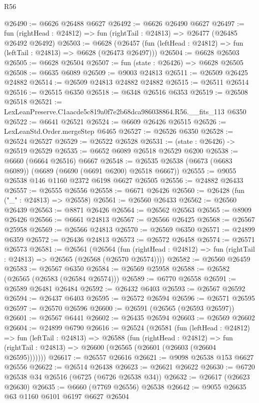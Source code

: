 \begin{lexlean}{R56}
\begin{coremodule}
@26490 := @6626 @26488 @6627
@26492 := @6626 @26490 @6627
@26497 := fun (rightHead : @24812) => fun (rightTail : @24813) => @26477 (@26485 @26492 @26492)
@26503 := @6628
    (@26457 (fun (leftHead : @24812) => fun (leftTail : @24813) => @6628 (@26473 @26497)))
@26504 := @6628 @26503
@26505 := @6628 @26504
@26507 := fun (state : @26426) => @6628 @26505
@26508 := @6635 @6089
@26509 := @9003 @24813
@26511 := @26509 @26425 @24882
@26514 := @26509 @24813 @24882 @24882
@26515 := @26511 @26514
@26516 := @26515 @6350
@26518 := @6348 @26516 @6353
@26519 := @26508 @26518
@26521 := LexLeanPreserve.C1aacde5c819a0f7e2b68dca986038864.R56.__fits_113 @6350
@26522 := @6641 @26521
@26524 := @6609 @26426 @26515
@26526 := LexLeanStd.Order.mergeStep @6465
@26527 := @26526 @6350
@26528 := @26524 @26527
@26529 := @26522 @26528
@26531 := (state : @26426) -> @26519 @26529
@26535 := @6652 @6089 @26518 @26529 @6200
@26538 := @6660 (@6664 @26516) @6667
@26548 := @26535 @26538 (@6673 (@6683 @6089)) (@6689 (@6690 (@6691 @6200) @26518 @6667))
@26555 := @9055 @26538 @146 @1160 @2372 @6198 @6627 @26505
@26556 := @24882 @26433
@26557 := @26555 @26556
@26558 := @6671 @26426
@26560 := @26428 (fun ("_" : @24813) => @26558)
@26561 := @26560 @26433
@26562 := @26560 @26439
@26563 := @8871 @26426
@26564 := @26562 @26563
@26565 := @8909 @26426
@26566 := @6661 @24813
@26567 := @26566 @26425
@26568 := @26567 @25958
@26569 := @26566 @24813
@26570 := @26569 @6350
@26571 := @24899 @6359
@26572 := @26436 @24813
@26573 := @26572 @26458
@26574 := @26571 @26573
@26581 := @26561
    (@26564
      (fun (rightHead : @24812) => fun (rightTail : @24813) => @26565 (@26568 (@26570 @26574))))
@26582 := @26560 @26459
@26583 := @26567 @6350
@26584 := @26569 @25958
@26588 := @26582 (@26565 (@26583 (@26584 @26574)))
@26589 := @6770 @26558
@26591 := @26589 @26481 @26484
@26592 := @26432 @6403
@26593 := @26567 @26592
@26594 := @26437 @6403
@26595 := @26572 @26594
@26596 := @26571 @26595
@26597 := @26570 @26596
@26600 := @26591 (@26565 (@26593 @26597))
@26601 := @26567 @6441
@26602 := @26435 @26594
@26603 := @26569 @26602
@26604 := @24899 @6790
@26616 := @26524
    (@26581
      (fun (leftHead : @24812) =>
      fun (leftTail : @24813) =>
      @26588
        (fun (rightHead : @24812) =>
        fun (rightTail : @24813) => @26600 (@26565 (@26601 (@26603 (@26604 @26595)))))))
@26617 := @26557 @26616
@26621 := @9098 @26538 @153 @6627 @26556
@26622 := @26514 @26438
@26623 := @26621 @26622
@26630 := @6720 @26538 @34 @26516 (@6725 (@6726 @26538 @34))
@26632 := @26617 (@26623 @26630)
@26635 := @6660 (@7769 @26556) @26538
@26642 := @9055 @26635 @63 @1160 @6101 @6197 @6627 @26504

\end{coremodule}
\end{lexlean}
